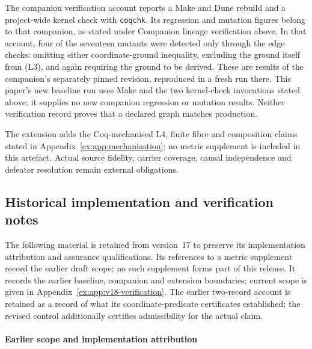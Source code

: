 \documentclass[11pt]{article}
\theoremstyle{definition}
\newcommand{\code}[1]{\texttt{#1}}
\begin{document}
The companion verification account reports a Make and Dune rebuild and a project-wide kernel check with \code{coqchk}. Its regression and mutation figures belong to that companion, as stated under Companion lineage verification above. In that account, four of the seventeen mutants were detected only through the edge checks: omitting either coordinate-ground inequality, excluding the ground itself from (L3), and again requiring the ground to be derived. These are results of the companion's separately pinned revision, reproduced in a fresh run there. This paper's new baseline run uses Make and the two kernel-check invocations stated above; it supplies no new companion regression or mutation results. Neither verification record proves that a declared graph matches production.

The extension adds the Coq-mechanised L4, finite fibre and composition claims stated in Appendix~\ref{ex:app:mechanisation}; no metric supplement is included in this artefact. Actual source fidelity, carrier coverage, causal independence and defeater resolution remain external obligations.




\subsection{Historical implementation and verification notes}\label{ex:app:history}
The following material is retained from version~17 to preserve its implementation attribution and assurance qualifications. Its references to a metric supplement record the earlier draft scope; no such supplement forms part of this release. It records the earlier baseline, companion and extension boundaries; current scope is given in Appendix~\ref{ex:app:v18-verification}. The earlier two-record account is retained as a record of what its coordinate-predicate certificates established; the revised control additionally certifies admissibility for the actual claim.

\paragraph{Earlier scope and implementation attribution}
\end{document}
